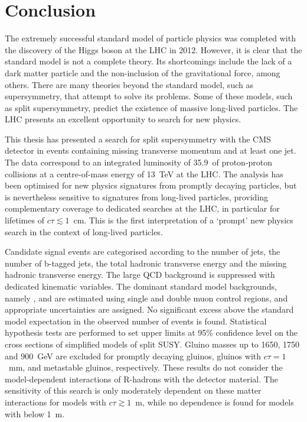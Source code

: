 \chapter{Conclusion}
\label{chap:conclusion}
The extremely successful standard model of particle physics was completed with 
the discovery of the Higgs boson at the LHC in 2012. However, it is clear that 
the standard model is not a complete theory. Its shortcomings 
include the lack of a dark matter particle and the non-inclusion of the 
gravitational force, %
among others. There are many theories beyond the 
standard model, such as supersymmetry, that attempt to solve its problems. Some 
of these models, such as split supersymmetry, predict the existence of massive 
long-lived particles. The LHC presents an excellent opportunity to search for 
new physics.

This thesis has presented a search for split supersymmetry with the CMS 
detector in events containing missing transverse momentum and at least one jet. 
The data correspond to an integrated luminosity of 35.9~\ifb of proton-proton 
collisions at a centre-of-mass energy of 13~TeV at the LHC. The analysis has 
been optimised for new physics signatures from promptly decaying particles, but 
is nevertheless sensitive to signatures from long-lived particles, providing 
complementary coverage to dedicated searches at the LHC, in particular for 
lifetimes of $c\tau \lesssim 1$~cm. This is the first 
interpretation of a `prompt' new physics search in the context of long-lived 
particles.

Candidate signal events are categorised according to the number of jets, the 
number of b-tagged jets, the total hadronic transverse energy and the missing 
hadronic transverse energy. The large QCD background is suppressed with 
dedicated kinematic variables. The dominant standard model backgrounds, namely 
\znnj, \wlj and \ttbar are estimated using single and double muon control 
regions, and appropriate uncertainties are assigned. No significant excess 
above the standard model expectation in the observed number of events is found. 
Statistical hypothesis tests are performed to set upper limits at 95\% 
confidence level on the cross sections of simplified models of split SUSY. 
Gluino masses up to 1650, 1750 and 900~GeV are excluded for promptly decaying 
gluinos, gluinos with $c\tau=1$~mm, and metastable gluinos, respectively. 
These results do not consider the model-dependent interactions of R-hadrons 
with the detector material. The sensitivity of this search is only moderately 
dependent on these matter interactions for models with $c\tau \gtrsim 1$~m, 
while no dependence is found for models with \ctau below 1~m.

